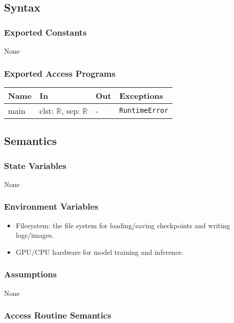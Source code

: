 \documentclass[12pt, titlepage]{article}
\begin{document}
\subsection{Syntax}

\subsubsection{Exported Constants}
None

\subsubsection{Exported Access Programs}

\begin{center}
\begin{tabular}{p{3cm} p{6cm} p{4.5cm} p{3cm}}
\hline
\textbf{Name} & \textbf{In} & \textbf{Out} & \textbf{Exceptions} \\
\hline
main & clst: \(\mathbb{R}\), sep: \(\mathbb{R}\) & - & \texttt{RuntimeError} \\
\hline
\end{tabular}
\end{center}

\subsection{Semantics}

\subsubsection{State Variables}
None

\subsubsection{Environment Variables}
\begin{itemize}
  \item Filesystem: the file system for loading/saving checkpoints and writing logs/images.
  \item GPU/CPU hardware for model training and inference.
\end{itemize}

\subsubsection{Assumptions}
None

\subsubsection{Access Routine Semantics}
\end{document}
